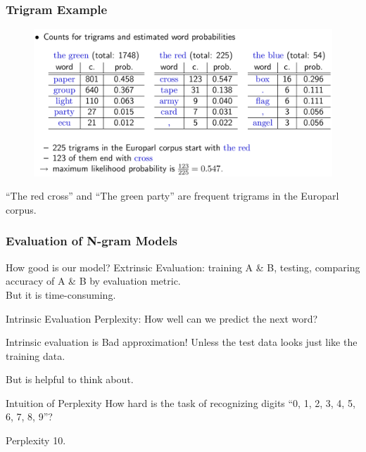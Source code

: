 \documentclass{beamer}
\begin{document}
\begin{frame}\frametitle{Trigram Example}
\begin{figure}
\includegraphics[width=1\linewidth]{figure/trigram_example.pdf}
\label{fig:trigram_example}
\end{figure}

``The red cross'' and ``The green party'' are frequent trigrams in the
Europarl corpus.
\end{frame}



\begin{frame}\frametitle{Evaluation of N-gram Models}

\begin{block}{How good is our model?}
Extrinsic Evaluation: training A \& B, testing, comparing accuracy of
A \& B by evaluation metric. \\

But it is \alert{time-consuming}.
\end{block}

\begin{block}{Intrinsic Evaluation}
Perplexity: How well can we predict the next word?

Intrinsic evaluation is \alert{Bad approximation}!
Unless the test data looks just like the training data. 

But is helpful to think about. 
\end{block}

\begin{block}{Intuition of Perplexity}
How hard is the task of recognizing digits ``0, 1, 2, 3, 4, 5, 6, 7,
8, 9''?

Perplexity 10.


\end{block}
\end{frame}
\end{document}
